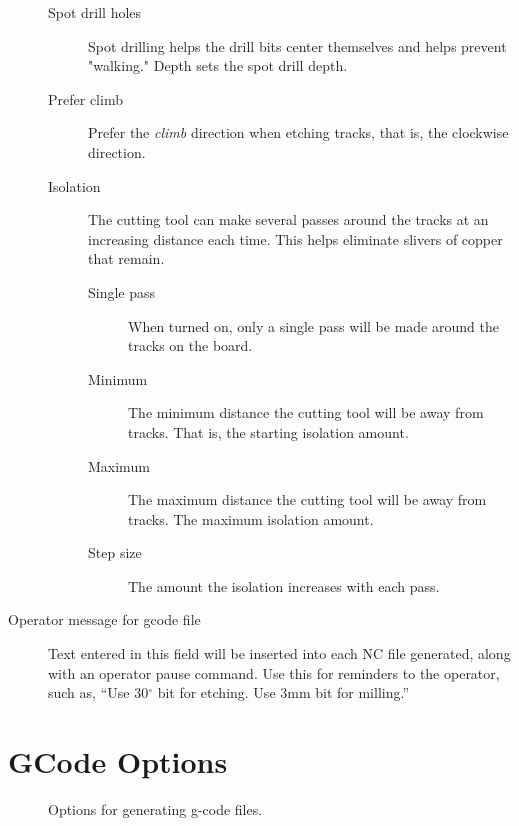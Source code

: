 \documentclass[11pt]{book}
\begin{document}
\begin{description}
\begin{description}
		\item[Spot drill holes] Spot drilling helps the drill bits center themselves and helps prevent "walking." Depth sets the spot drill depth.
		\item[Prefer climb] Prefer the \emph{climb} direction when etching tracks, that is, the clockwise direction.
		\item[Isolation] The cutting tool can make several passes around the tracks at an increasing distance each time. This helps eliminate slivers of copper that remain.
		\begin{description}
			\item[Single pass] When turned on, only a single pass will be made around the tracks on the board.
			\item[Minimum] The minimum distance the cutting tool will be away from tracks. That is, the starting isolation amount.
			\item[Maximum] The maximum distance the cutting tool will be away from tracks. The maximum isolation amount.
			\item[Step size] The amount the isolation increases with each pass.
		\end{description}
	\end{description}
	\item[Operator message for gcode file] Text entered in this field will be inserted into each NC file generated, along with an operator pause command. Use this for reminders to the operator, such as, ``Use 30$^\circ$ bit for etching. Use 3mm bit for milling.''
\end{description}

%
%
\section{GCode Options}\label{sec:GCodeOptions}

\begin{figure}
	\caption{Options for generating g-code files.}
	\label{fig:GCodeOptions}
\end{figure}
\end{document}
